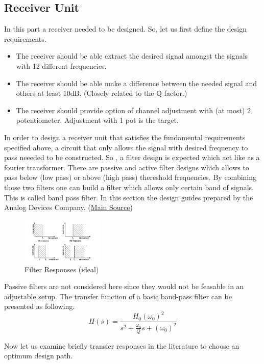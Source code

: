 \documentclass[letterpaper,12pt]{article}
\begin{document}
\subsection{Receiver Unit}
In this part a receiver needed to be designed. So, let us first define the design requirements.
\begin{itemize}
    \item The receiver should be able extract the desired signal amongst the signals with 12 different frequencies.
    \item The receiver should be able make a difference between the needed signal and others at least 10dB. (Closely related to the Q factor.)
    \item The receiver should provide option of channel adjustment with (at most) 2 potentiometer. Adjustment with 1 pot is the target. 
\end{itemize}
In order to design a receiver unit that satisfies the fundamental requirements specified above, a circuit that only allows the signal with desired frequency to pass neeeded to be constructed. So , a filter design is expected which act like as a fourier transformer. There are passive and active filter designs which allows to pass below (low pass) or above (high pass) thereshold frequencies. By combining those two filters one can build a filter which allows only certain band of signals. This is called band pass filter. In this  section the design guides prepared by the Analog Devices Company. (\href{https://www.analog.com/media/en/training-seminars/design-handbooks/basic-linear-design/chapter8.pdf}{Main Source})
\begin{figure}[H]
    \centering
    \includegraphics[width = 0.35\textwidth]{bandpass.png}
    \caption{Filter Responses (ideal)}
\end{figure} 
Passive filters are not considered here since they would not be feasable in an adjustable setup. The transfer function of a basic band-pass filter can be presented as following. 
\[
H(s) = \frac{H_0 (\omega_0)^2}{s^2 + \frac{\omega_0}{Q} s  + (\omega_0)^2}    
\]

Now let us examine briefly transfer responses in the literature to choose an optimum design path.
\vspace{-4mm}
\end{document}
